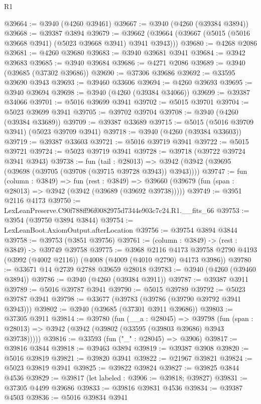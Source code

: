 \begin{lexlean}{R1}
\begin{coremodule}
@39664 := @3940 (@4260 @39461)
@39667 := @3940 (@4260 (@39384 @3894))
@39668 := @39387 @3894
@39679 := @39662 (@39664 (@39667 (@5015 (@5016 @39668 @3941) (@5023 @39668 @3941) @3941 @3943)))
@39680 := @4268 @2086
@39681 := @4260 @39680
@39683 := @3940 @39681 @3941
@39684 := @3942 @39683
@39685 := @3940 @39684
@39686 := @4271 @2086
@39689 := @3940 (@39685 (@37302 @39686))
@39690 := @37306 @39686
@39692 := @33595 @39690 @3943
@39693 := @39460 @33606
@39694 := @4260 @39693
@39695 := @3940 @39694
@39698 := @3940 (@4260 (@39384 @34066))
@39699 := @39387 @34066
@39701 := @5016 @39699 @3941
@39702 := @5015 @39701
@39704 := @5023 @39699 @3941
@39705 := @39702 @39704
@39708 := @3940 (@4260 (@39384 @33689))
@39709 := @39387 @33689
@39715 := @5015 (@5016 @39709 @3941) (@5023 @39709 @3941)
@39718 := @3940 (@4260 (@39384 @33603))
@39719 := @39387 @33603
@39721 := @5016 @39719 @3941
@39722 := @5015 @39721
@39724 := @5023 @39719 @3941
@39728 := @39718 (@39722 @39724 @3941 @3943)
@39738 := fun (tail : @28013) =>
  @3942 (@3942 (@39695 (@39698 (@39705 (@39708 (@39715 @39728 @3943)) @3943))))
@39747 := fun (column : @3849) =>
  fun (rest : @3849) =>
  @39660 (@39679 (fun (span : @28013) => @3942 (@3942 (@39689 (@39692 @39738)))))
@39749 := @3951 @2116 @4173
@39750 := LexLeanPreserve.C90f788ff96f0082975d7344e903c7c24.R1.__fits_66
@39753 := @3954 (@39750 @3894 @3844)
@39754 := LexLeanBoot.AxiomOutput.afterLocation
@39756 := @39754 @3894 @3844
@39758 := @39753 (@3851 @39756)
@39761 := (column : @3849) -> (rest : @3849) -> @39749 @39758
@39775 := @3968
    @2116
    @4173
    @39758
    @2790
    @4193
    (@3992 (@4002 @2116))
    (@4008 (@4009 (@4010 @2790) @4173 @3986))
@39780 := @33671 @14 @2739 @2788 @39659 @28018
@39783 := @3940 (@4260 (@39460 @3894))
@39786 := @3940 (@4260 (@39384 @3911))
@39787 := @39387 @3911
@39789 := @5016 @39787 @3941
@39790 := @5015 @39789
@39792 := @5023 @39787 @3941
@39798 := @33677 (@39783 (@39786 (@39790 @39792 @3941 @3943)))
@39802 := @3940 (@39685 (@37301 @3911 @39686))
@39803 := @37305 @3911
@39814 := @39780
    (fun (__a : @28045) =>
    @39798 (fun (span : @28013) => @3942 (@3942 (@39802 (@33595 (@39803 @39686) @3943 @39738)))))
@39816 := @33593 (fun ("_" : @28045) => @3906)
@39817 := @39816 @3844
@39818 := @39463 @3894
@39819 := @39387 @3908
@39820 := @5016 @39819
@39821 := @39820 @3941
@39822 := @21967 @39821
@39824 := @5023 @39819 @3941
@39825 := @39822 @39824
@39827 := @39825 @3844 @4536
@39829 := @39817 (let labeled : @3906 := @39818; @39827)
@39831 := @37305 @4499 @39686
@39833 := @39816 @39831 @4536
@39834 := @39387 @4503
@39836 := @5016 @39834 @3941

\end{coremodule}
\end{lexlean}
